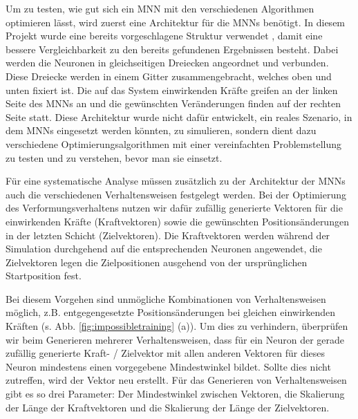 \documentclass[10pt]{scrartcl}
\begin{document}
Um zu testen, wie gut sich ein MNN mit den verschiedenen Algorithmen optimieren lässt, wird zuerst eine Architektur für die MNNs benötigt.
In diesem Projekt wurde eine bereits vorgeschlagene Struktur verwendet \cite{Lee2022}, damit eine bessere Vergleichbarkeit zu den bereits gefundenen Ergebnissen besteht.
Dabei werden die Neuronen in gleichseitigen Dreiecken angeordnet und verbunden.
Diese Dreiecke werden in einem Gitter zusammengebracht, welches oben und unten fixiert ist.
Die auf das System einwirkenden Kräfte greifen an der linken Seite des MNNs an und die gewünschten Veränderungen finden auf der rechten Seite statt.
Diese Architektur wurde nicht dafür entwickelt, ein reales Szenario, in dem MNNs eingesetzt werden könnten, zu simulieren, sondern dient dazu verschiedene Optimierungsalgorithmen mit einer vereinfachten Problemstellung zu testen und zu verstehen, bevor man sie einsetzt.

Für eine systematische Analyse müssen zusätzlich zu der Architektur der MNNs auch die verschiedenen Verhaltensweisen festgelegt werden.
Bei der Optimierung des Verformungsverhaltens nutzen wir dafür zufällig generierte Vektoren für die einwirkenden Kräfte (Kraftvektoren) sowie die gewünschten Positionsänderungen in der letzten Schicht (Zielvektoren).
Die Kraftvektoren werden während der Simulation durchgehend
auf die entsprechenden Neuronen angewendet, die Zielvektoren legen die Zielpositionen ausgehend von der ursprünglichen Startposition fest.

Bei diesem Vorgehen sind unmögliche Kombinationen von Verhaltensweisen möglich, z.B. entgegengesetzte Positionsänderungen bei gleichen einwirkenden Kräften (s. Abb. \ref{fig:impossibletraining} (a)).
Um dies zu verhindern, überprüfen wir beim Generieren mehrerer Verhaltensweisen, dass für ein Neuron der gerade zufällig generierte Kraft- / Zielvektor mit allen anderen Vektoren für dieses Neuron mindestens einen vorgegebene Mindestwinkel bildet. 
Sollte dies nicht zutreffen, wird der Vektor neu erstellt.
Für das Generieren von Verhaltensweisen gibt es so drei Parameter: Der Mindestwinkel zwischen Vektoren, die Skalierung der Länge der Kraftvektoren und die Skalierung der Länge der Zielvektoren.
\end{document}
